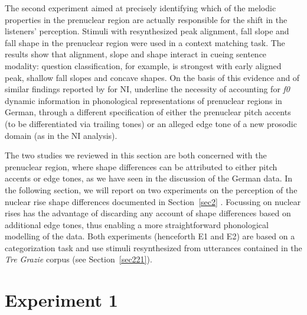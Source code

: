 The second experiment aimed at precisely identifying which of the melodic properties in the prenuclear region are actually responsible for the shift in the listeners' perception. Stimuli with resynthesized peak alignment, fall slope and fall shape in the prenuclear region were used in a context matching task. The results show that alignment, slope and shape interact in cueing sentence modality: question classification, for example, is strongest with early aligned peak, shallow fall slopes and concave shapes. On the basis of this evidence and of similar findings reported by \citet{petrone2011tones} for NI, \citeauthor{petrone2014intonation} underline the necessity of accounting for \textit{f0} dynamic information in phonological representations of prenuclear regions in German, through a different specification of either the prenuclear pitch accents (to be differentiated via trailing tones) or an alleged edge tone of a new prosodic domain (as in the NI analysis).

The two studies we reviewed in this section are both concerned with the prenuclear region, where shape differences can be attributed to either pitch accents or edge tones, as we have seen in the discussion of the German data. In the following section, we will report on two experiments on the perception of the nuclear rise shape differences documented in Section~\ref{sec2} \citep{dimperio2009interplay}. Focussing on nuclear rises has the advantage of discarding any account of shape differences based on additional edge tones, thus enabling a more straightforward phonological modelling of the data. Both experiments (henceforth E1 and E2) are based on a categorization task and use stimuli resynthesized from utterances contained in the \textit{Tre Grazie} corpus (see Section~\ref{sec221}).

\section{Experiment 1}\label{sec32}
